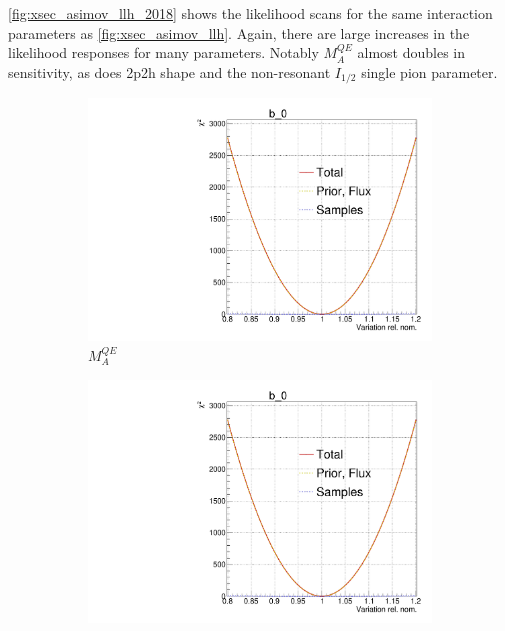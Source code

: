 \autoref{fig:xsec_asimov_llh_2018} shows the likelihood scans for the same interaction parameters as \autoref{fig:xsec_asimov_llh}. Again, there are large increases in the likelihood responses for many parameters. Notably $M_A^{QE}$ almost doubles in sensitivity, as does 2p2h shape and the non-resonant $I_{1/2}$ single pion parameter.
\begin{figure}[h]
	\centering
	\begin{subfigure}[t]{0.32\textwidth}
		\includegraphics[width=\textwidth,page=105, trim={0mm 0mm 0mm 11mm}, clip]{figures/mach3/2018/llh/tryBinningNumber6_after_fit_asimov_asimov_ND280logL_scan}
		\caption{$M_A^{QE}$}
	\end{subfigure}
	\begin{subfigure}[t]{0.32\textwidth}
		\includegraphics[width=\textwidth,page=108, trim={0mm 0mm 0mm 11mm}, clip]{figures/mach3/2018/llh/tryBinningNumber6_after_fit_asimov_asimov_ND280logL_scan}

\end{subfigure}
\end{figure}
